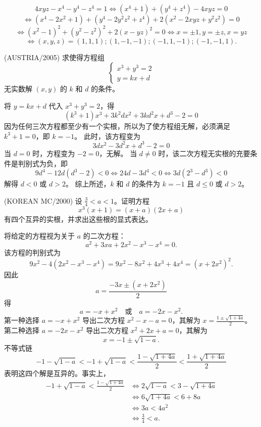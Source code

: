 \begin{questions}
\begin{solution}
\[
4xyz - x^4 - y^4 - z^4 = 1 \Leftrightarrow (x^4 + 1) + (y^4 + z^4) - 4xyz = 0
\]
\[
\Leftrightarrow (x^4 - 2x^2 + 1) + (y^4 - 2y^2z^2 + z^4) + 2(x^2 - 2xyz + y^2z^2) = 0
\]
\[
\Leftrightarrow (x^2 - 1)^2 + (y^2 - z^2)^2 + 2(x - yz)^2 = 0 \Leftrightarrow x = \pm 1, y = \pm z, x = yz
\]
\[
\Leftrightarrow (x, y, z) = (1, 1, 1); (1, -1, -1); (-1, 1, -1); (-1, -1, 1).
\]
\end{solution}

\question (AUSTRIA/2005) 求使得方程组
\[
\begin{cases} 
x^3 + y^3 = 2 \\ 
y = kx + d 
\end{cases}
\]
无实数解 $(x, y)$ 的 $k$ 和 $d$ 的条件。

\begin{solution}
将 $y = kx + d$ 代入 $x^3 + y^3 = 2$，得
\[
(k^3 + 1)x^3 + 3k^2dx^2 + 3kd^2x + d^3 - 2 = 0
\]
因为任何三次方程都至少有一个实根，所以为了使方程组无解，必须满足 $k^3 + 1 = 0$，即 $k = -1$。
此时，该方程变为
\[
3dx^2 - 3d^2x + d^3 - 2 = 0
\]
当 $d = 0$ 时，方程变为 $-2 = 0$，无解。
当 $d \neq 0$ 时，该二次方程无实根的充要条件是判别式为负，即
\[
9d^4 - 12d(d^3 - 2) < 0 \iff 24d - 3d^4 < 0 \iff 3d(2^3 - d^3) < 0
\]
解得 $d < 0$ 或 $d > 2$。
综上所述，$k$ 和 $d$ 的条件为 $k = -1$ 且 $d \le 0$ 或 $d > 2$。
\end{solution}

\question (KOREAN MC/2000) 设 $\frac{3}{4} < a < 1$。证明方程
\[
x^3(x + 1) = (x + a)(2x + a)
\]
有四个互异的实根，并求出这些根的显式表达。

\begin{solution}
将给定的方程视为关于 $a$ 的二次方程：
\[
a^2 + 3xa + 2x^2 - x^3 - x^4 = 0.
\]
该方程的判别式为
\[
9x^2 - 4(2x^2 - x^3 - x^4) = 9x^2 - 8x^2 + 4x^3 + 4x^4 = (x + 2x^2)^2.
\]
因此
\[
a = \frac{-3x \pm (x + 2x^2)}{2}
\]
得
\[
a = -x + x^2 \quad \text{或} \quad a = -2x - x^2.
\]
第一种选择 $a = -x + x^2$ 导出二次方程 $x^2 - x - a = 0$，其解为 $x = \frac{1 \pm \sqrt{1 + 4a}}{2}$。
第二种选择 $a = -2x - x^2$ 导出二次方程 $x^2 + 2x + a = 0$，其解为
\[
x = -1 \pm \sqrt{1 - a}.
\]
不等式链
\[
-1 - \sqrt{1 - a} < -1 + \sqrt{1 - a} < \frac{1 - \sqrt{1 + 4a}}{2} < \frac{1 + \sqrt{1 + 4a}}{2}
\]
表明这四个解是互异的。事实上，
\begin{align*}
-1 + \sqrt{1 - a} < \frac{1 - \sqrt{1 + 4a}}{2} &\iff 2\sqrt{1 - a} < 3 - \sqrt{1 + 4a} \\
&\iff 6\sqrt{1 + 4a} < 6 + 8a \\
&\iff 3a < 4a^2 \\
&\iff \frac{3}{4} < a.
\end{align*}
\end{solution}


\end{questions}
